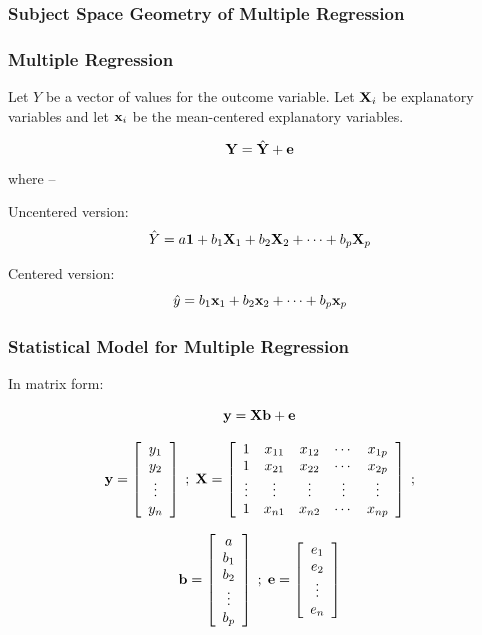 \documentclass{beamer}
\begin{document}
\begin{frame}
  \frametitle{Subject Space Geometry of Multiple Regression}

\begin{center}

\end{center}
\end{frame}

\begin{frame}
  \frametitle{Multiple Regression}

Let $Y$ be a vector of values for the outcome variable. Let $\mathbf{X}_i$ be explanatory variables and let $\mathbf{x}_i$ be the mean-centered explanatory variables.
\medskip

$$
\mathbf{Y} = \hat{\mathbf{Y}} + \mathbf{e}
$$
where --
\bigskip

Uncentered version:
$$
\hat{Y} = a\mathbf{1} + b_1\mathbf{X}_1 + b_2\mathbf{X}_2 + \cdots + b_p\mathbf{X}_p
$$

Centered version:
$$
\hat{y} = b_1\mathbf{x}_1 + b_2\mathbf{x}_2 + \cdots + b_p\mathbf{x}_p
$$


\end{frame}
\begin{frame}
  \frametitle{Statistical Model for Multiple Regression}

In matrix form:

$$  
\mathbf{y} = \mathbf{X}\mathbf{b} + \mathbf{e}
$$

$$
\mathbf{y} = \left[ \begin{array}{c}
y_1 \\ y_2 \\ \vdots \\y_n \\
\end{array}
\right]
\;
;
\;
\mathbf{X} = \left[ \begin{array}{ccccc}
1 & x_{11} & x_{12} & \cdots & x_{1p} \\
1 & x_{21} & x_{22} & \cdots & x_{2p} \\
\vdots & \vdots & \vdots & \vdots & \vdots \\
1 & x_{n1} & x_{n2} & \cdots & x_{np} \\
\end{array}
\right]
\;
;
$$

$$
\mathbf{b} = \left[ \begin{array}{c}
a \\ b_1 \\ b_2 \\ \vdots \\ b_p \\
\end{array}
\right]
\;
;
\;
\mathbf{e} = \left[ \begin{array}{c}
e_1 \\ e_2 \\ \vdots \\e_n \\
\end{array}
\right]
$$

\end{frame}
\end{document}
